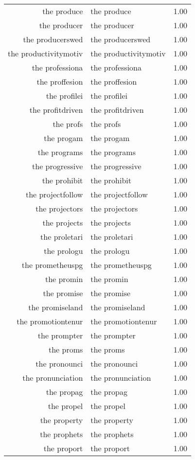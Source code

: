 \begin{table}[ht]
\begin{tabular}{rlr}
  the produce & the produce & 1.00 \\ 
  the producer & the producer & 1.00 \\ 
  the producerswed & the producerswed & 1.00 \\ 
  the productivitymotiv & the productivitymotiv & 1.00 \\ 
  the professiona & the professiona & 1.00 \\ 
  the proffesion & the proffesion & 1.00 \\ 
  the profilei & the profilei & 1.00 \\ 
  the profitdriven & the profitdriven & 1.00 \\ 
  the profs & the profs & 1.00 \\ 
  the progam & the progam & 1.00 \\ 
  the programs & the programs & 1.00 \\ 
  the progressive & the progressive & 1.00 \\ 
  the prohibit & the prohibit & 1.00 \\ 
  the projectfollow & the projectfollow & 1.00 \\ 
  the projectors & the projectors & 1.00 \\ 
  the projects & the projects & 1.00 \\ 
  the proletari & the proletari & 1.00 \\ 
  the prologu & the prologu & 1.00 \\ 
  the prometheuspg & the prometheuspg & 1.00 \\ 
  the promin & the promin & 1.00 \\ 
  the promise & the promise & 1.00 \\ 
  the promiseland & the promiseland & 1.00 \\ 
  the promotiontenur & the promotiontenur & 1.00 \\ 
  the prompter & the prompter & 1.00 \\ 
  the proms & the proms & 1.00 \\ 
  the pronounci & the pronounci & 1.00 \\ 
  the pronunciation & the pronunciation & 1.00 \\ 
  the propag & the propag & 1.00 \\ 
  the propel & the propel & 1.00 \\ 
  the property & the property & 1.00 \\ 
  the prophets & the prophets & 1.00 \\ 
  the proport & the proport & 1.00 \\ 

\end{tabular}
\end{table}
